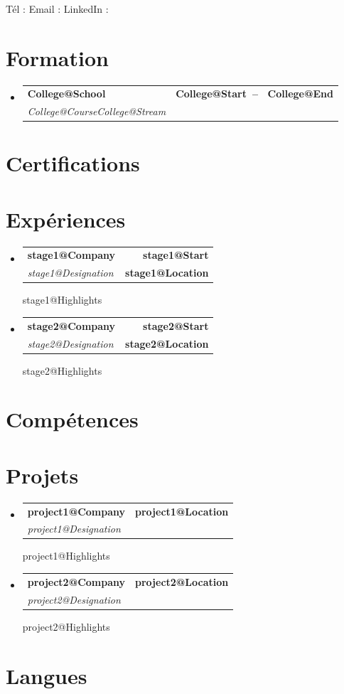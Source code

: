 \documentclass[letterpaper,11pt]{article}
\makeatletter
\newcommand{\resumeSubheading}[4]{
  \vspace{-2pt}\item
    \begin{tabular*}{1.0\textwidth}[t]{l@{\extracolsep{\fill}}r}
      \textbf{#1} & \textbf{\small #2} \\
      \textit{\small#3} & \textbf{\small #4} \\
    \end{tabular*}\vspace{-7pt}
}
\newcommand{\resumeSubHeadingListStart}{\begin{itemize}[leftmargin=0.0in, label={}]}
\newcommand{\resumeSubHeadingListEnd}{\end{itemize}}
\def\titlesection{
\begin{center}
    {\Huge \scshape \firstname \ \lastname} \\ \vspace{2pt}
    \normalsize \textit{\role} \\ \vspace{2pt}
    \small \stackline \\ \vspace{2pt}
    \small T\'el : \jasphone \quad Email : \email \quad LinkedIn : \linkedin
    \vspace{-8pt}
\end{center}
}
\newcommand{\renderExp}[1]{
  \resumeSubheading
      {\csname #1@Company\endcsname}{\csname #1@Location\endcsname}
      {\csname #1@Designation\endcsname}{}
  \csname #1@Highlights\endcsname
}
\newcommand{\renderStage}[1]{
  \resumeSubheading
      {\csname #1@Company\endcsname}{\csname #1@Start\endcsname}
      {\csname #1@Designation\endcsname}{\csname #1@Location\endcsname}
  \csname #1@Highlights\endcsname
}
\makeatother
\begin{document}
\titlesection

\vspace{0.8em}

\section{Formation}
  \resumeSubHeadingListStart
      \resumeSubheading{\csname College@School\endcsname}
      {\csname College@Start\endcsname \ -- \ \csname College@End\endcsname}
      {\csname College@Course\endcsname \csname College@Stream\endcsname}{}
  \resumeSubHeadingListEnd

\section{Certifications}
\certifications

\section{Exp\'eriences}
  \resumeSubHeadingListStart
    \renderStage{stage1}
    \renderStage{stage2}
  \resumeSubHeadingListEnd

\section{Comp\'etences}
\skills

\section{Projets}
  \resumeSubHeadingListStart
    \renderExp{project1}
    \renderExp{project2}
  \resumeSubHeadingListEnd

\section{Langues}
\langs
\end{document}
